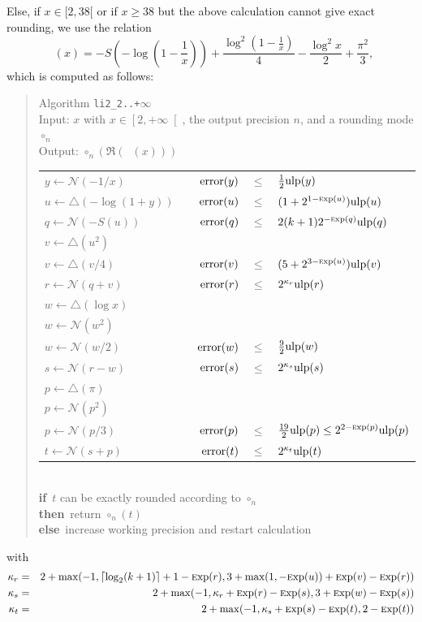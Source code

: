 \documentclass[12pt]{amsart}
\DeclareMathOperator{\LiTwo}{Li_2}
\def\n{\textnormal}
\def\pinf{\bigtriangleup}
\def\ulp{{\rm ulp}}
\def\Exp{{\rm \textsc exp}}
\def\N{{\mathcal N}}
\def\If{{\bf if}}
\def\then{{\bf then}}
\def\Else{{\bf else}}
\begin{document}
Else, if $x \in [2, 38[$ or if $x \geq 38$ but the above calculation cannot 
give exact rounding, we use the relation
\[
\LiTwo(x) = -S\left(-\log(1-\frac{1}{x})\right)
+ \frac{\log^2\left(1-\frac{1}{x}\right)}{4}
- \frac{\log^2x}{2} + \frac{\pi^2}{3},
\]
which is computed as follows:
\begin{quote}
Algorithm {\tt li2\_2..+$\infty$}\\
Input: $x$ with $x \in \left[2, +\infty\right[$, the output precision $n$,
and a rounding mode $\circ_n$ \\
Output: $\circ_n(\Re(\LiTwo(x)))$ \\
\begin{tabular}{l c r c l}
$y \leftarrow \N(-1/x)$ & &
$\n{error}(y) $ & $ \leq $ & $\frac{1}{2} \ulp(y)$\\
$u \leftarrow \pinf(-\log(1+y))$ &&
$\n{error}(u) $ & $ \leq $ & $(1 + 2^{1-\Exp(u)}) \ulp(u)$\\
$q \leftarrow \N(-S(u))$ &&
$\n{error}(q) $ & $ \leq $ & $2 (k+1) 2^{-\Exp(q)} \ulp(q)$\\

$v \leftarrow \pinf(u^2)$ \\
$v \leftarrow \pinf(v / 4)$ & &
$\n{error}(v) $ & $ \leq $ & $(5 + 2^{3-\Exp(u)}) \ulp(v)$\\
$r \leftarrow \N(q + v)$ & &
$\n{error}(r) $ & $ \leq $ & $2^{\kappa_r} \ulp(r)$\\

$w \leftarrow \pinf(\log x)$\\
$w \leftarrow \N(w^2)$\\
$w \leftarrow \N(w/2)$ & & $\n{error}(w) $ & $ \leq $ & $\frac{9}{2} \ulp(w)$\\
$s \leftarrow \N(r - w)$ & &
$\n{error}(s) $ & $ \leq $ & $2^{\kappa_s} \ulp(s)$\\

$p \leftarrow \pinf(\pi)$ \\
$p \leftarrow \N(p^2)$ \\
$p \leftarrow \N(p/3)$ & &
$\n{error}(p) $ & $ \leq $ & $\frac{19}{2}\ulp(p) \leq 2^{2-\Exp(p)}\ulp(p)$\\
$t \leftarrow \N(s + p)$ & &
$\n{error}(t) $ & $ \leq $ & $2^{\kappa_t} \ulp(t)$
\end{tabular}\\
\If\ $t$ can be exactly rounded according to $\circ_n$\\
\then\ return $\circ_n(t)$\\
\Else\ increase working precision and restart calculation
\end{quote}
with
\begin{eqnarray*}
\kappa_r & = & 2 + {\rm max}(-1, \lceil\log_2(k+1)\rceil + 1 - \Exp(r),
3 + {\rm max}(1, -\Exp(u)) + \Exp(v) - \Exp(r))\\
\kappa_s & = & 2 + {\rm max}(-1, \kappa_r + \Exp(r) - \Exp(s),
3 + \Exp(w) - \Exp(s))\\
\kappa_t & = & 2 + {\rm max}(-1, \kappa_s + \Exp(s) - \Exp(t),
2 - \Exp(t))
\end{eqnarray*}
\end{document}

